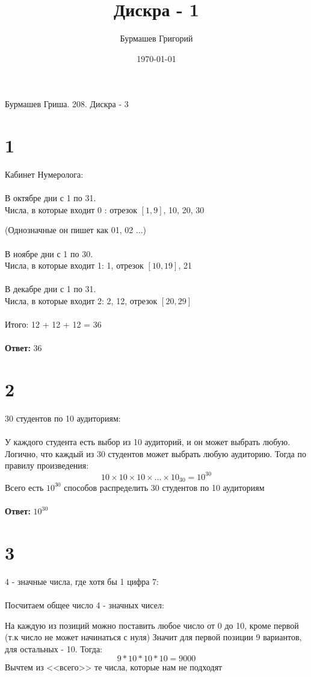 \documentclass[a4paper,12pt]{article}
\author{Бурмашев Григорий}
\title{Дискра - 1}
\date{\today}
\begin{document}
\begin{center}
Бурмашев Гриша. 208. Дискра - 3
\end{center}
\section*{1}
Кабинет Нумеролога:\\\\
В октябре дни с 1 по 31. \\Числа, в которые входит 0 : отрезок $[1, 9]$, 10, 20, 30

(Однозначные он пишет как 01, 02 $\ldots$)
\\\\
В ноябре дни с 1 по 30. \\Числа, в которые входит 1: 1, отрезок $[10, 19]$, 21
\\\\
В декабре дни с 1 по 31. \\Числа, в которые входит 2: 2, 12, отрезок $[20, 29]$
\\\\
Итого: 12 + 12 + 12 = 36
\\\\
\textbf{Ответ:} 36
\section*{2}
30 студентов по 10 аудиториям:
\\\\
У каждого студента есть выбор из 10 аудиторий,  и он может выбрать любую. Логично, что каждый из 30 студентов может выбрать любую аудиторию.  Тогда по правилу произведения:
\[
10 \times 10 \times 10 \times \ldots \times 10_{30} = 10^{30}
\]
Всего есть $10^{30}$ способов распределить 30 студентов по 10 аудиториям
\\\\
\textbf{Ответ:} $10^{30}$
\section*{3}
4 - значные числа, где хотя бы 1 цифра 7:
\\\\
Посчитаем общее число 4 - значных чисел:

На каждую из позиций можно поставить любое число от 0 до 10, кроме первой (т.к число не может начинаться с нуля) Значит для первой позиции 9 вариантов,  для остальных - 10. Тогда:
\[
9 * 10 * 10 * 10  = 9000
\]
Вычтем из <<всего>>  те числа, которые нам не подходят
\end{document}
